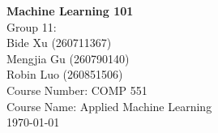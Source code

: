 \begin{titlepage}
\begin{center}

\HRule

\textbf{\Huge Machine Learning 101} \\
\bigskip\bigskip\bigskip\bigskip\bigskip\bigskip\bigskip\bigskip\bigskip\bigskip\bigskip
{Group 11: }\\
{Bide Xu (260711367)}\\
{Mengjia Gu (260790140)}\\
{Robin Luo (260851506)}\\
\bigskip\bigskip\bigskip\bigskip\bigskip\bigskip\bigskip\bigskip\bigskip\bigskip\bigskip
{Course Number: COMP 551}\\
{Course Name: Applied Machine Learning}\\
{\today}

\end{center}
\end{titlepage} 
